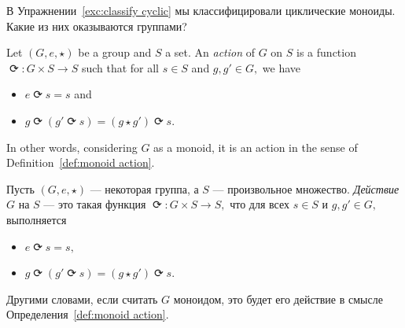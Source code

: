 \documentclass[../main/CT4S-EN-RU]{subfiles}
\begin{document}
\begin{exerciseRUS}
В Упражнении~\ref{exc:classify cyclic} мы классифицировали циклические моноиды. Какие из них оказываются группами? 
\end{exerciseRUS}

\begin{definitionENG}\label{def:group action}
Let $(G,e,{⋆})$ be a group and $S$ a set. An {\em action} of $G$ on $S$ is a function ${⟳}\colon G\times S{→} S$ such that for all $s\in S$ and $g,g'\in G,$ we have
\begin{itemize}
\item $e{⟳} s=s$ and
\item $g{⟳}(g'{⟳} s)=(g{⋆} g'){⟳} s.$
\end{itemize}
In other words, considering $G$ as a monoid, it is an action in the sense of Definition~\ref{def:monoid action}.
\end{definitionENG}

\begin{definitionRUS}\label{def:group action}
Пусть $(G,e,{⋆})$ — некоторая группа, а $S$ — произвольное множество. {\em Действие} $G$ на $S$ — это такая функция ${⟳}\colon G\times S{→} S,$ что для всех $s\in S$ и $g,g'\in G,$ выполняется
\begin{itemize}
\item $e{⟳} s=s,$
\item $g{⟳}(g'{⟳} s)=(g{⋆} g'){⟳} s.$
\end{itemize}
Другими словами, если считать $G$ моноидом, это будет его действие в смысле Определения~\ref{def:monoid action}.
\end{definitionRUS}
\end{document}
